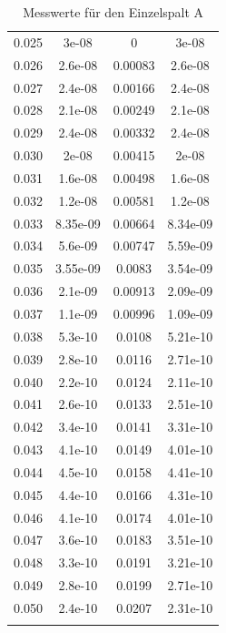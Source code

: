 \documentclass[11pt,ngerman,a4paper]{article}
\begin{document}
\begin{longtable}{SSSS}
0.025 & 3e-08 & 0 & 3e-08\\
0.026 & 2.6e-08 & 0.00083 & 2.6e-08\\
0.027 & 2.4e-08 & 0.00166 & 2.4e-08\\
0.028 & 2.1e-08 & 0.00249 & 2.1e-08\\
0.029 & 2.4e-08 & 0.00332 & 2.4e-08\\
0.030 & 2e-08 & 0.00415 & 2e-08\\
0.031 & 1.6e-08 & 0.00498 & 1.6e-08\\
0.032 & 1.2e-08 & 0.00581 & 1.2e-08\\
0.033 & 8.35e-09 & 0.00664 & 8.34e-09\\
0.034 & 5.6e-09 & 0.00747 & 5.59e-09\\
0.035 & 3.55e-09 & 0.0083 & 3.54e-09\\
0.036 & 2.1e-09 & 0.00913 & 2.09e-09\\
0.037 & 1.1e-09 & 0.00996 & 1.09e-09\\
0.038 & 5.3e-10 & 0.0108 & 5.21e-10\\
0.039 & 2.8e-10 & 0.0116 & 2.71e-10\\
0.040 & 2.2e-10 & 0.0124 & 2.11e-10\\
0.041 & 2.6e-10 & 0.0133 & 2.51e-10\\
0.042 & 3.4e-10 & 0.0141 & 3.31e-10\\
0.043 & 4.1e-10 & 0.0149 & 4.01e-10\\
0.044 & 4.5e-10 & 0.0158 & 4.41e-10\\
0.045 & 4.4e-10 & 0.0166 & 4.31e-10\\
0.046 & 4.1e-10 & 0.0174 & 4.01e-10\\
0.047 & 3.6e-10 & 0.0183 & 3.51e-10\\
0.048 & 3.3e-10 & 0.0191 & 3.21e-10\\
0.049 & 2.8e-10 & 0.0199 & 2.71e-10\\
0.050 & 2.4e-10 & 0.0207 & 2.31e-10\\
\bottomrule
\caption{Messwerte für den Einzelspalt A}
\end{longtable}
\end{document}
